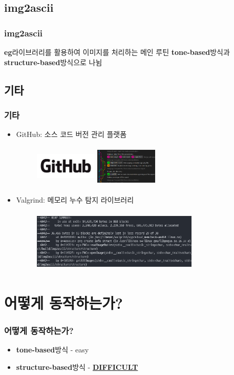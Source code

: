 \documentclass{beamer}
\newcommand{\spacing}{\hspace{0.3em}}
\newcommand{\eg}{\textbf{eg}}
\newcommand{\imgascii}{\textbf{img2ascii}}
\newcommand{\tonebased}{\textbf{tone-based}}
\newcommand{\structurebased}{\textbf{structure-based}}
\begin{document}
	\subsection{\imgascii}
	\begin{frame}{}
		\frametitle{\imgascii}
		\eg \spacing 라이브러리를 활용하여 이미지를 처리하는 메인 루틴
		\tonebased \spacing 방식과 \structurebased \spacing 방식으로 나뉨
	\end{frame}

	\subsection{기타}
	\begin{frame}{}
		\frametitle{기타}
		\begin{itemize}
			\item GitHub: 소스 코드 버전 관리 플랫폼
			\begin{figure}
				\includegraphics[width=3cm, height=2cm]{GitHub1.png}
				\hspace{1em}
				\includegraphics[width=3cm, height=2cm]{GitHub2.png}
			\end{figure}
			\item Valgrind: 메모리 누수 탐지 라이브러리
			\begin{figure}
				\includegraphics[width=8cm, height=3cm]{Valgrind.png}
			\end{figure}
		\end{itemize}
	\end{frame}

\section{어떻게 동작하는가?}
\begin{frame}{}
	\frametitle{어떻게 동작하는가?}
	\begin{itemize}
		\item \tonebased \spacing 방식 - easy
		\item \structurebased \spacing 방식 - \underline{\textbf{DIFFICULT}}
	\end{itemize}
\end{frame}
\end{document}
